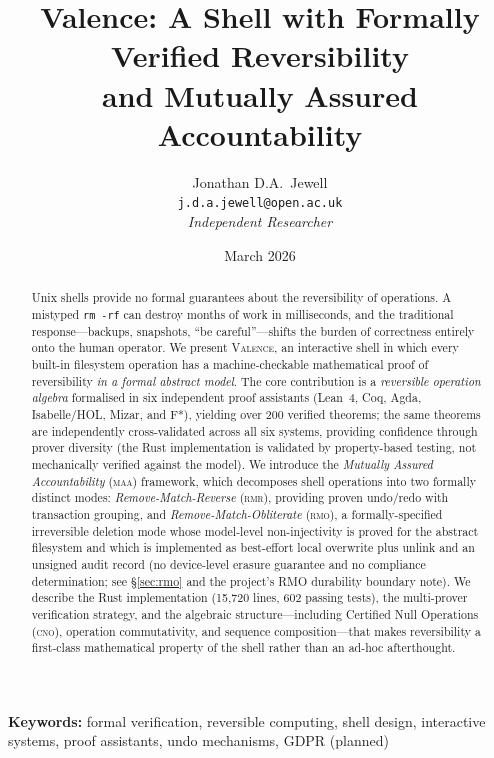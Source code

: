 \documentclass[11pt,a4paper]{article}
\title{%
  \textbf{Valence: A Shell with Formally Verified Reversibility\\
  and Mutually Assured Accountability}
}
\author{%
  Jonathan D.A.\ Jewell\\
  \texttt{j.d.a.jewell@open.ac.uk}\\
  \textit{Independent Researcher}
}
\date{March 2026}
\newcommand{\valence}{\textsc{Valence}}
\newcommand{\rmr}{\textsc{rmr}}
\newcommand{\rmo}{\textsc{rmo}}
\newcommand{\maa}{\textsc{maa}}
\newcommand{\cno}{\textsc{cno}}
\newcommand{\lean}{Lean~4}
\begin{document}
\maketitle

\begin{abstract}
Unix shells provide no formal guarantees about the reversibility of operations.
A mistyped \texttt{rm -rf} can destroy months of work in milliseconds, and the
traditional response---backups, snapshots, ``be careful''---shifts the burden of
correctness entirely onto the human operator. We present \valence{}, an
interactive shell in which every built-in filesystem operation has a
machine-checkable mathematical proof of reversibility \emph{in a formal
abstract model}. The core contribution is a \emph{reversible operation algebra}
formalised in six independent proof assistants (\lean{}, Coq, Agda,
Isabelle/HOL, Mizar, and F*), yielding over 200 verified theorems; the same
theorems are independently cross-validated across all six systems, providing
confidence through prover diversity (the Rust implementation is validated by
property-based testing, not mechanically verified against the model). We
introduce the \emph{Mutually Assured Accountability} (\maa{}) framework, which
decomposes shell operations into two formally distinct modes:
\emph{Remove-Match-Reverse} (\rmr{}), providing proven undo/redo with
transaction grouping, and \emph{Remove-Match-Obliterate} (\rmo{}), a
formally-specified irreversible deletion mode whose model-level
non-injectivity is proved for the abstract filesystem and which is implemented
as best-effort local overwrite plus unlink and an unsigned audit record (no
device-level erasure guarantee and no compliance determination; see
\S\ref{sec:rmo} and the project's RMO durability boundary note).
We describe the Rust implementation (15,720 lines, 602 passing tests), the
multi-prover verification strategy, and the algebraic structure---including
Certified Null Operations (\cno{}), operation commutativity, and sequence
composition---that makes reversibility a first-class mathematical property of
the shell rather than an ad-hoc afterthought.
\end{abstract}

\noindent\textbf{Keywords:} formal verification, reversible computing, shell
design, interactive systems, proof assistants, undo mechanisms, GDPR (planned)
\end{document}
